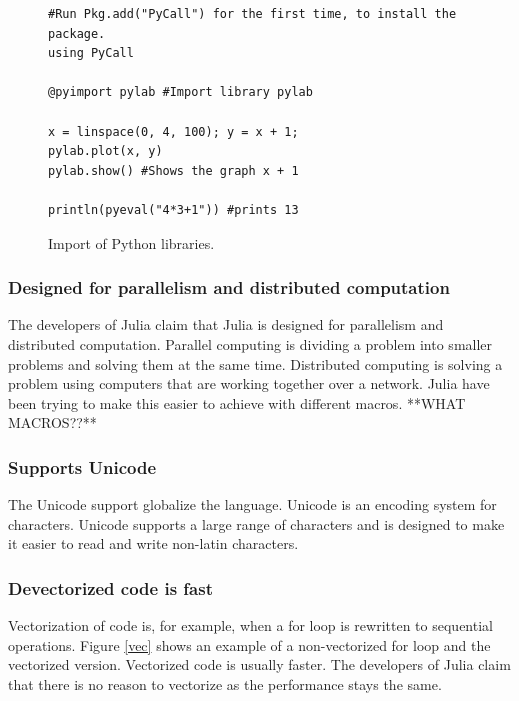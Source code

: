 \documentclass[a4paper, 11pt, titlepage]{article}
\begin{document}
\begin{figure}[H]
		\centering
		\begin{lstlisting}
#Run Pkg.add("PyCall") for the first time, to install the package.
using PyCall

@pyimport pylab #Import library pylab

x = linspace(0, 4, 100); y = x + 1;
pylab.plot(x, y)
pylab.show() #Shows the graph x + 1

println(pyeval("4*3+1")) #prints 13
		\end{lstlisting}
		\caption{Import of Python libraries.}
\end{figure}

\subsubsection{Designed for parallelism and distributed computation}
The developers of Julia claim that Julia is designed for parallelism and distributed computation. Parallel computing is dividing a problem into smaller problems and solving them at the same time. Distributed computing is solving a problem using computers that are working together over a network. Julia have been trying to make this easier to achieve with different macros.
**WHAT MACROS??**

\subsubsection{Supports Unicode}
The Unicode support globalize the language. Unicode is an encoding system for characters. Unicode supports a large range of characters and is designed to make it easier to read and write non-latin characters.

\subsubsection{Devectorized code is fast}
Vectorization of code is, for example, when a for loop is rewritten to sequential operations. Figure \ref{vec} shows an example of a non-vectorized for loop and the vectorized version. Vectorized code is usually faster. The developers of Julia claim that there is no reason to vectorize as the performance stays the same.
\end{document}

